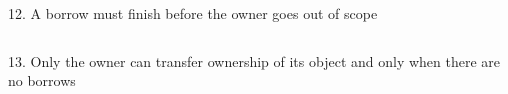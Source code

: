 \documentclass[9pt]{beamer}
\renewcommand\big[1]{
  \begin{center}
    \Large{#1}
  \end{center}
}
\begin{document}
\begin{frame}
  \big{12. A borrow must finish before the owner goes out of scope}
\end{frame}

\begin{frame}[fragile]
  \inputminted{rust}{demos/10_too_long.rs}
\end{frame}

\begin{frame}
  \big{13. Only the owner can transfer ownership of its object and only when there are no borrows}
\end{frame}

\begin{frame}[fragile]
  \inputminted{rust}{demos/11_move_out.rs}
\end{frame}

\begin{frame}[fragile]
  \inputminted{rust}{demos/12_move_out.rs}
\end{frame}
\end{document}
